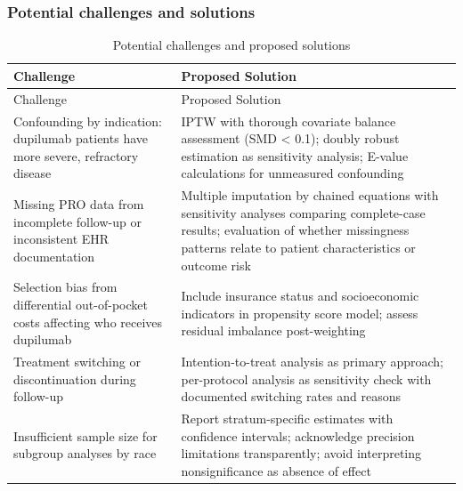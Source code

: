 \documentclass[
]{agujournal2019}
\begin{document}
\subsubsection{Potential challenges and
solutions}\label{potential-challenges-and-solutions}

\begin{longtable}[]{@{}
  >{\raggedright\arraybackslash}p{}
  >{\raggedright\arraybackslash}p{}@{}}
\caption{Potential challenges and proposed
solutions}\label{tbl-challenges}\tabularnewline
\toprule\noalign{}
\begin{minipage}[b]{\linewidth}\raggedright
Challenge
\end{minipage} & \begin{minipage}[b]{\linewidth}\raggedright
Proposed Solution
\end{minipage} \\
\midrule\noalign{}
\endfirsthead
\toprule\noalign{}
\begin{minipage}[b]{\linewidth}\raggedright
Challenge
\end{minipage} & \begin{minipage}[b]{\linewidth}\raggedright
Proposed Solution
\end{minipage} \\
\midrule\noalign{}
\endhead
\bottomrule\noalign{}
\endlastfoot
Confounding by indication: dupilumab patients have more severe,
refractory disease & IPTW with thorough covariate balance assessment
(SMD \textless{} 0.1); doubly robust estimation as sensitivity analysis;
E-value calculations for unmeasured confounding \\
Missing PRO data from incomplete follow-up or inconsistent EHR
documentation & Multiple imputation by chained equations with
sensitivity analyses comparing complete-case results; evaluation of
whether missingness patterns relate to patient characteristics or
outcome risk \\
Selection bias from differential out-of-pocket costs affecting who
receives dupilumab & Include insurance status and socioeconomic
indicators in propensity score model; assess residual imbalance
post-weighting \\
Treatment switching or discontinuation during follow-up &
Intention-to-treat analysis as primary approach; per-protocol analysis
as sensitivity check with documented switching rates and reasons \\
Insufficient sample size for subgroup analyses by race & Report
stratum-specific estimates with confidence intervals; acknowledge
precision limitations transparently; avoid interpreting nonsignificance
as absence of effect \\
\end{longtable}
\end{document}
